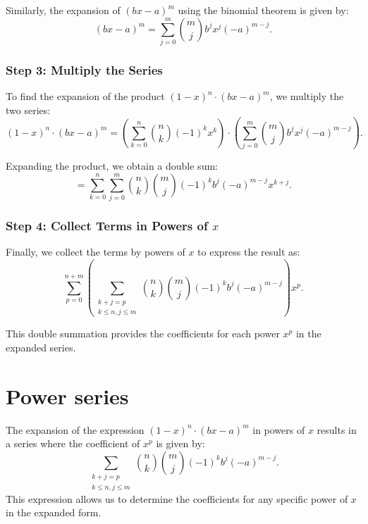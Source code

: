 Similarly, the expansion of \((bx - a)^m\) using the binomial theorem is given by:
\begin{equation}
(bx - a)^m = \sum_{j=0}^{m} \binom{m}{j} b^j x^j (-a)^{m-j}.
\end{equation}

\subsubsection*{Step 3: Multiply the Series}

To find the expansion of the product \((1-x)^n \cdot (bx - a)^m\), we multiply the two series:
\begin{equation}
(1-x)^n \cdot (bx - a)^m = \left( \sum_{k=0}^{n} \binom{n}{k} (-1)^k x^k \right) \cdot \left( \sum_{j=0}^{m} \binom{m}{j} b^j x^j (-a)^{m-j} \right).
\end{equation}

Expanding the product, we obtain a double sum:
\begin{equation}
= \sum_{k=0}^{n} \sum_{j=0}^{m} \binom{n}{k} \binom{m}{j} (-1)^k b^j (-a)^{m-j} x^{k+j}.
\end{equation}

\subsubsection*{Step 4: Collect Terms in Powers of \(x\)}

Finally, we collect the terms by powers of \(x\) to express the result as:
\begin{equation}
\sum_{p=0}^{n+m} \left( \sum_{\substack{k+j=p \\ k \leq n, j \leq m}} \binom{n}{k} \binom{m}{j} (-1)^k b^j (-a)^{m-j} \right) x^p.
\end{equation}

This double summation provides the coefficients for each power \(x^p\) in the expanded series.

\section*{Power series}

The expansion of the expression \((1-x)^n \cdot (bx - a)^m\) in powers of \(x\) results in a series where the coefficient of \(x^p\) is given by:
\begin{equation*}
\sum_{\substack{k+j=p \\ k \leq n, j \leq m}} \binom{n}{k} \binom{m}{j} (-1)^k b^j (-a)^{m-j}.
\end{equation*}
This expression allows us to determine the coefficients for any specific power of \(x\) in the expanded form.













